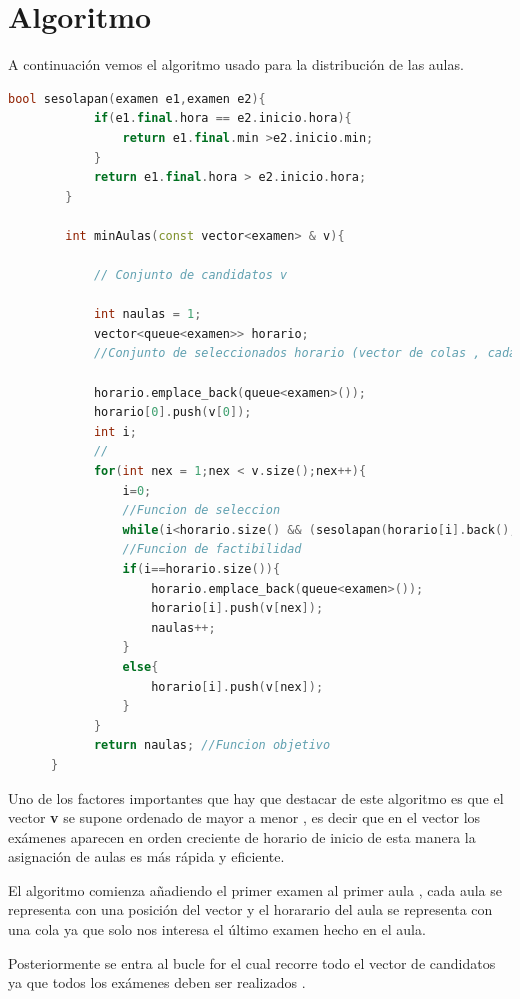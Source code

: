 \documentclass[11pt,openany]{book}
\begin{document}
\section{Algoritmo}

A continuación vemos el algoritmo usado para la distribución de las aulas.

\begin{lstlisting}[language=C++]
      bool sesolapan(examen e1,examen e2){
            if(e1.final.hora == e2.inicio.hora){
                return e1.final.min >e2.inicio.min;
            }
            return e1.final.hora > e2.inicio.hora;
        }
        
        int minAulas(const vector<examen> & v){
        
            // Conjunto de candidatos v
        
            int naulas = 1;
            vector<queue<examen>> horario;
            //Conjunto de seleccionados horario (vector de colas , cada cola es un aula)
            
            horario.emplace_back(queue<examen>());
            horario[0].push(v[0]);
            int i;
            //
            for(int nex = 1;nex < v.size();nex++){
                i=0;
                //Funcion de seleccion
                while(i<horario.size() && (sesolapan(horario[i].back(),v[nex]))){i++;}
                //Funcion de factibilidad
                if(i==horario.size()){
                    horario.emplace_back(queue<examen>());
                    horario[i].push(v[nex]);
                    naulas++;
                }
                else{
                    horario[i].push(v[nex]);
                }
            }
            return naulas; //Funcion objetivo 
      }
\end{lstlisting}

Uno de los factores importantes que hay que destacar de este algoritmo es que el vector \textbf{v} se supone 
ordenado de mayor a menor , es decir que en el vector los exámenes aparecen en orden creciente de 
horario de inicio de esta manera la asignación de aulas es más rápida y eficiente.

El algoritmo comienza añadiendo el primer examen al primer aula , cada aula se representa con una posición del vector 
y el horarario del aula se representa con una cola ya que solo nos interesa el último examen hecho en el aula.

Posteriormente se entra al bucle for el cual recorre todo el vector de candidatos ya que todos los exámenes deben
ser realizados . 
\end{document}

